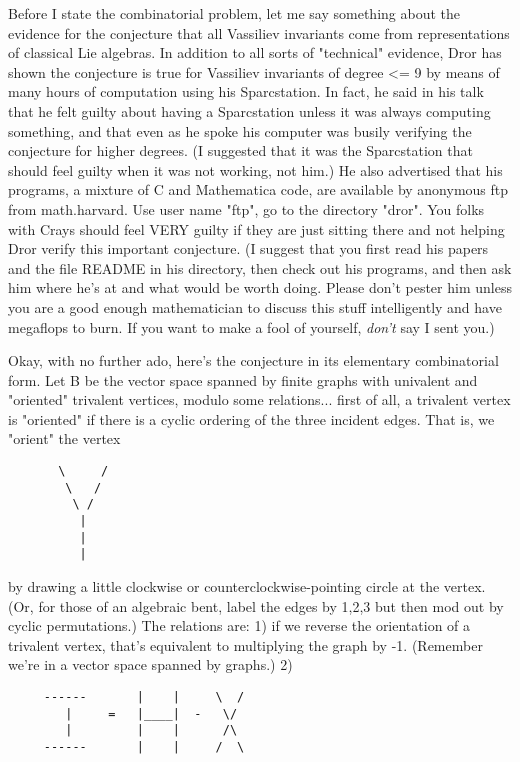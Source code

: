 Before I state the combinatorial problem, let me say
something about the evidence for the conjecture that all Vassiliev
invariants come from representations of classical Lie algebras.  In
addition to all sorts of "technical" evidence, Dror has shown the 
conjecture is true for Vassiliev invariants of degree <= 9 by means
of many hours of computation using his Sparcstation.  In fact, he said
in his talk that he felt guilty about having a Sparcstation unless it
was always computing something, and that even as he spoke his computer
was busily verifying the conjecture for higher degrees.  (I suggested
that it was the Sparcstation that should feel guilty when it was not
working, not him.)  He also advertised that his programs, a mixture of C
and Mathematica code, are available by anonymous ftp from math.harvard.
Use user name "ftp", go to the directory "dror".  You folks with Crays 
should feel VERY guilty if they are just sitting there and not helping
Dror verify this important conjecture. (I suggest that you first read his
papers and the file README in his directory, then check out his
programs, and then ask him where he's at and what would be worth doing.
Please don't pester him unless you are a good enough mathematician to
discuss this stuff intelligently and have megaflops to burn.  If you
want to make a fool of yourself, \emph{don't} say I sent you.)  

Okay, with no further ado, here's the conjecture in its elementary
combinatorial form.  Let B be the vector space spanned by finite graphs with
univalent and "oriented" trivalent vertices, modulo some
relations... first of all, a trivalent vertex is "oriented" if there is
a cyclic ordering of the three incident edges.  That is, we "orient" the
vertex 


\begin{verbatim}
       \     /
        \   /
         \ /
          |
          |
          |
\end{verbatim}
    

by drawing a little clockwise or counterclockwise-pointing circle at the
vertex.  (Or, for those of an algebraic bent, label the edges by 1,2,3
but then mod out by cyclic permutations.)  The relations are: 1)  if we
reverse the orientation of a trivalent vertex, that's equivalent to
multiplying the graph by -1.  (Remember we're in a vector space spanned
by graphs.)  2)  

\begin{verbatim}
	 ------       |    |     \  /
	    |     =   |____|  -   \/
	    |         |    |      /\
	 ------       |    |     /  \
\end{verbatim}
    

